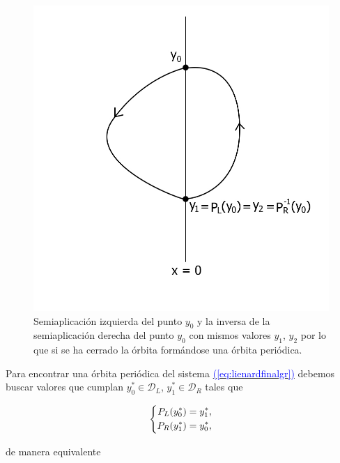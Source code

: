 \documentclass[12pt,a4paper]{report} %
\newcommand{\eref}[1]{\hyperref[#1]{\textcolor{blue}{(\ref*{#1})}}}
\begin{document}
	\begin{figure}[h]
		\centering
		\includegraphics[width=1.1\textwidth,center]{aplipoincareL-Rcerrado.jpg}
		\caption{Semiaplicación izquierda del punto $y_0$ y la inversa de la semiaplicación derecha del punto $y_0$ con mismos valores $y_1$, $y_2$ por lo que si se ha cerrado la órbita formándose una órbita periódica.}
		\label{fig:aplipoincareL-Rcerrado}
	\end{figure}\smallskip
	
	\newpage
	
	\vspace{0.5cm}\noindent Para encontrar una órbita periódica del sistema \eref{eq:lienardfinalgr} debemos buscar valores que cumplan $y_0^*\in \mathcal{D}_L$, $y_1^*\in \mathcal{D}_R$ tales que
	
	\begin{equation*}
		\label{eq:ej1}
		\scalebox{1}{$\displaystyle
			\left\{
			\begin{aligned}
				P_L(y_0^*)=y_1^*, \\
				P_R(y_1^*)=y_0^* ,
			\end{aligned}
			\right. 
			$}
	\end{equation*}\smallskip
	
	\noindent de manera equivalente
	
\end{document}
